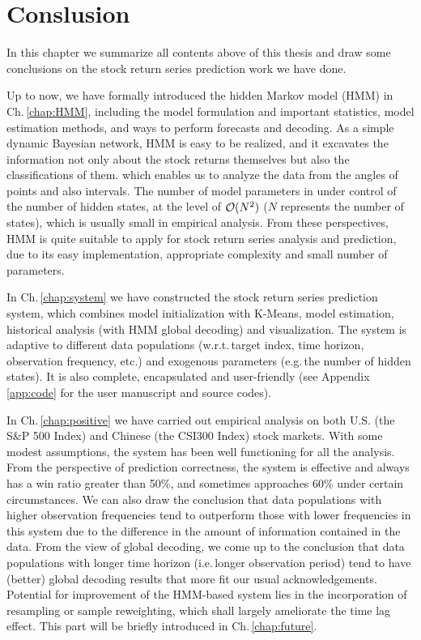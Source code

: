 
\chapter{Conslusion}
\label{chap:conclusion}

In this chapter we summarize all contents above of this thesis and 
draw some conclusions on the stock return series prediction work we have done.

Up to now,
we have formally introduced the hidden Markov model (HMM) in Ch.\,\ref{chap:HMM},
including the model formulation and important statistics, 
model estimation methods, and ways to perform forecasts and decoding.
As a simple dynamic Bayesian network,
HMM is easy to be realized, 
and it excavates the information not only about the stock returns themselves 
but also the classifications of them.
which enables us to analyze the data from the angles of points and also intervals.
The number of model parameters in under control of the number of hidden states,
at the level of ${\cal O}(N^2)$ ($N$ represents the number of states),
which is usually small in empirical analysis.
From these perspectives, 
HMM is quite suitable to apply for stock return series analysis and prediction,
due to its easy implementation, appropriate complexity and small number of parameters.

In Ch.\,\ref{chap:system} we have constructed the stock return series prediction system,
which combines model initialization with K-Means,
model estimation, historical analysis (with HMM global decoding) and visualization.
The system is adaptive to different data populations 
(w.r.t.\,target index, time horizon, observation frequency, etc.) and 
exogenous parameters (e.g.\,the number of hidden states).
It is also complete, encapsulated and user-friendly 
(see Appendix \ref{app:code} for the user manuscript and source codes).

In Ch.\,\ref{chap:positive} we have carried out empirical analysis on 
both U.S. (the S\&P 500 Index) and Chinese (the CSI300 Index) stock markets.
With some modest assumptions,
the system has been well functioning for all the analysis.
From the perspective of prediction correctness,
the system is effective and always has a win ratio greater than 50\%,
and sometimes approaches 60\% under certain circumstances.
We can also draw the conclusion that data populations with higher observation frequencies
tend to outperform those with lower frequencies in this system
due to the difference in the amount of information contained in the data.
From the view of global decoding,
we come up to the conclusion that data populations with longer time horizon 
(i.e.\,longer observation period)
tend to have (better) global decoding results that more fit our usual acknowledgements.
Potential for improvement of the HMM-based system lies in 
the incorporation of resampling or sample reweighting,
which shall largely ameliorate the time lag effect.
This part will be briefly introduced in Ch.\,\ref{chap:future}.

